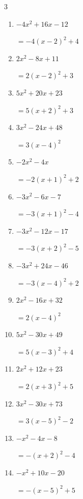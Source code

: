 \begin{multicols}{3}
\begin{enumerate}
  \item $-4x^{2}+16x-12$

        $=-4\left( x-2\right)^{2}+4$

  \item $2x^{2}-8x+11$

        $=2\left( x-2\right)^{2}+3$

  \item $5x^{2}+20x+23$

        $=5\left( x+2\right)^{2}+3$

  \item $3x^{2}-24x+48$

        $=3\left( x-4\right)^{2}$

  \item $-2x^{2}-4x$

        $=-2\left( x+1\right)^{2}+2$

  \item $-3x^{2}-6x-7$

        $=-3\left( x+1\right)^{2}-4$

  \item $-3x^{2}-12x-17$

        $=-3\left( x+2\right)^{2}-5$

  \item $-3x^{2}+24x-46$

        $=-3\left( x-4\right)^{2}+2$

  \item $2x^{2}-16x+32$

        $=2\left( x-4\right)^{2}$

  \item $5x^{2}-30x+49$

        $=5\left( x-3\right)^{2}+4$

\columnbreak %

  \item $2x^{2}+12x+23$

        $=2\left( x+3\right)^{2}+5$

  \item $3x^{2}-30x+73$

        $=3\left( x-5\right)^{2}-2$

  \item $-x^{2}-4x-8$

        $=-\left( x+2\right)^{2}-4$

  \item $-x^{2}+10x-20$

        $=-\left( x-5\right)^{2}+5$


\end{enumerate}
\end{multicols}
